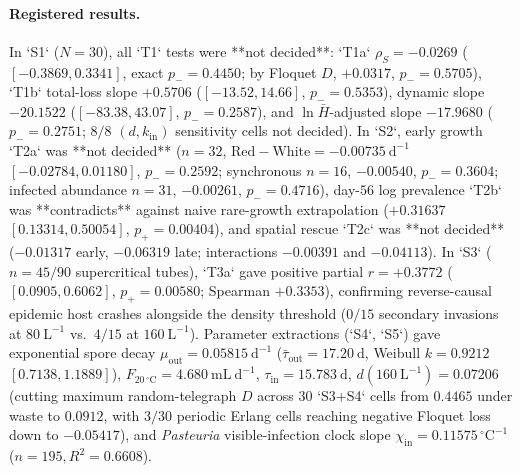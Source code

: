 \paragraph{Registered results.}
In `S1` ($N = 30$), all `T1` tests were **not decided**: `T1a` $\rho_S = -0.0269$ ($[-0.3869, 0.3341]$, exact $p_- = 0.4450$; by Floquet $D$, $+0.0317$, $p_- = 0.5705$), `T1b` total-loss slope $+0.5706$ ($[-13.52, 14.66]$, $p_- = 0.5353$), dynamic slope $-20.1522$ ($[-83.38, 43.07]$, $p_- = 0.2587$), and $\ln\bar{H}$-adjusted slope $-17.9680$ ($p_- = 0.2751$; $8/8$ $(d, k_{\mathrm{in}})$ sensitivity cells not decided). In `S2`, early growth `T2a` was **not decided** ($n = 32$, $\mathrm{Red} - \mathrm{White} = -0.00735\ \mathrm{d}^{-1}$ $[-0.02784, 0.01180]$, $p_- = 0.2592$; synchronous $n = 16$, $-0.00540$, $p_- = 0.3604$; infected abundance $n = 31$, $-0.00261$, $p_- = 0.4716$), day-$56$ log prevalence `T2b` was **contradicts** against naive rare-growth extrapolation ($+0.31637$ $[0.13314, 0.50054]$, $p_+ = 0.00404$), and spatial rescue `T2c` was **not decided** ($-0.01317$ early, $-0.06319$ late; interactions $-0.00391$ and $-0.04113$). In `S3` ($n = 45/90$ supercritical tubes), `T3a` gave positive partial $r = +0.3772$ ($[0.0905, 0.6062]$, $p_+ = 0.00580$; Spearman $+0.3353$), confirming reverse-causal epidemic host crashes alongside the density threshold ($0/15$ secondary invasions at $80\ \mathrm{L}^{-1}$ vs.\ $4/15$ at $160\ \mathrm{L}^{-1}$). Parameter extractions (`S4`, `S5`) gave exponential spore decay $\mu_{\mathrm{out}} = 0.05815\ \mathrm{d}^{-1}$ ($\bar{\tau}_{\mathrm{out}} = 17.20\ \mathrm{d}$, Weibull $k = 0.9212$ $[0.7138, 1.1889]$), $F_{20\,^{\circ}\mathrm{C}} = 4.680\ \mathrm{mL\ d}^{-1}$, $\tau_{\mathrm{in}} = 15.783\ \mathrm{d}$, $d(160\ \mathrm{L}^{-1}) = 0.07206$ (cutting maximum random-telegraph $D$ across $30$ `S3+S4` cells from $0.4465$ under waste to $0.0912$, with $3/30$ periodic Erlang cells reaching negative Floquet loss down to $-0.05417$), and \textit{Pasteuria} visible-infection clock slope $\chi_{\mathrm{in}} = 0.11575\,^{\circ}\mathrm{C}^{-1}$ ($n = 195, R^2 = 0.6608$).


